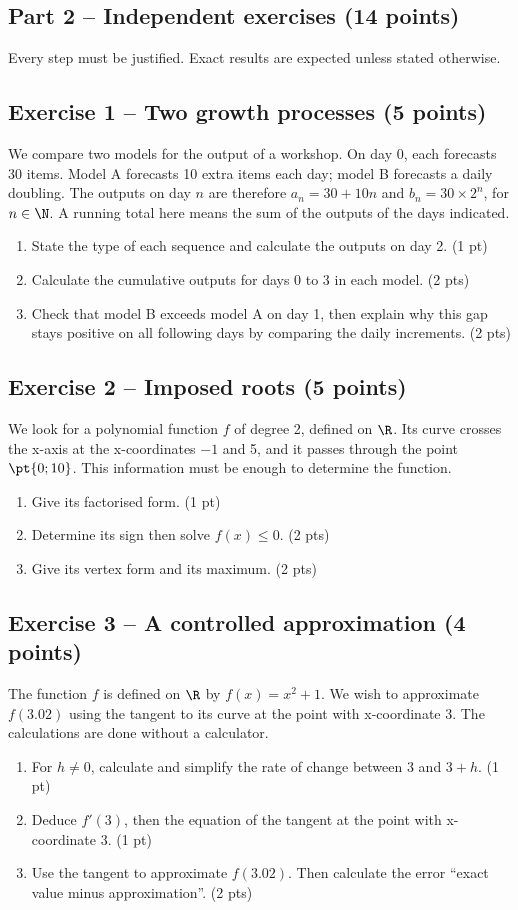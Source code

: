 \mxnewpage\subsection*{Part 2 -- Independent exercises (14 points)}
Every step must be justified. Exact results are expected unless stated otherwise.
\subsection*{Exercise 1 -- Two growth processes (5 points)}
We compare two models for the output of a workshop. On day 0, each forecasts 30 items. Model A forecasts 10 extra items each day; model B forecasts a daily doubling. The outputs on day $n$ are therefore $a_n=30+10n$ and $b_n=30\times2^n$, for $n\in\N$. A running total here means the sum of the outputs of the days indicated.
\begin{enumerate}
\item State the type of each sequence and calculate the outputs on day 2. \hfill(1 pt)
\item Calculate the cumulative outputs for days 0 to 3 in each model. \hfill(2 pts)
\item Check that model B exceeds model A on day 1, then explain why this gap stays positive on all following days by comparing the daily increments. \hfill(2 pts)
\end{enumerate}
\subsection*{Exercise 2 -- Imposed roots (5 points)}
We look for a polynomial function $f$ of degree 2, defined on $\R$. Its curve crosses the x-axis at the x-coordinates $-1$ and 5, and it passes through the point $\pt{0;10}$. This information must be enough to determine the function.
\begin{enumerate}
\item Give its factorised form. \hfill(1 pt)
\item Determine its sign then solve $f(x)\leq0$. \hfill(2 pts)
\item Give its vertex form and its maximum. \hfill(2 pts)
\end{enumerate}
\subsection*{Exercise 3 -- A controlled approximation (4 points)}
The function $f$ is defined on $\R$ by $f(x)=x^2+1$. We wish to approximate $f(\num{3,02})$ using the tangent to its curve at the point with x-coordinate 3. The calculations are done without a calculator.
\begin{enumerate}
\item For $h\ne0$, calculate and simplify the rate of change between 3 and $3+h$. \hfill(1 pt)
\item Deduce $f\prime(3)$, then the equation of the tangent at the point with x-coordinate 3. \hfill(1 pt)
\item Use the tangent to approximate $f(\num{3,02})$. Then calculate the error ``exact value minus approximation''. \hfill(2 pts)
\end{enumerate}
